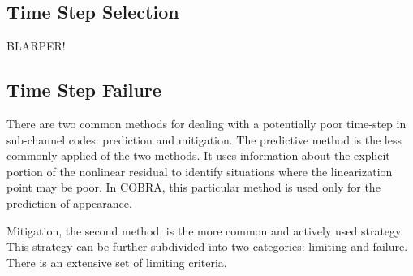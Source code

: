 \subsection{Time Step Selection}
\label{subsect:time_step_selection}
BLARPER!
\subsection{Time Step Failure}
\label{subsect:time_step_failure}
There are two common methods for dealing with a potentially poor time-step in sub-channel codes: prediction and mitigation.
The predictive method is the less commonly applied of the two methods.
It uses information about the explicit portion of the nonlinear residual to identify situations where the linearization point may be poor.
In COBRA, this particular method is used only for the prediction of \ncg appearance.

Mitigation, the second method, is the more common and actively used strategy.
This strategy can be further subdivided into two categories: limiting and failure.
There is an extensive set of limiting criteria.
